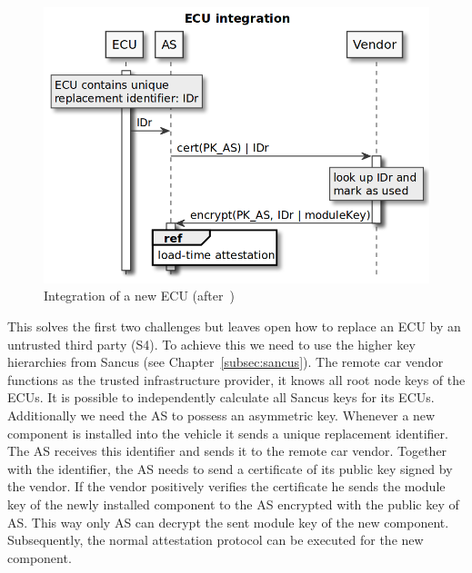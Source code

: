 \begin{figure}[h]
    \centering
    \captionsetup{justification=centering}
	\includegraphics[width=1\linewidth]{Figures/VulCAN_ecu_replacement.png}
	\caption[]{Integration of a new ECU (after~\cite{VanBulck2017})}
	\label{fig:vulcan_ecu_replacement}
\end{figure}

This solves the first two challenges but leaves open how to replace an ECU by an
untrusted third party (S4). To achieve this we need to use the higher key
hierarchies from Sancus (see Chapter~\ref{subsec:sancus}). The remote car vendor
functions as the trusted infrastructure provider, it knows all root node keys of
the ECUs. It is possible to independently calculate all Sancus keys for its
ECUs. Additionally we need the AS to possess an asymmetric key. Whenever a new
component is installed into the vehicle it sends a unique replacement
identifier. The AS receives this identifier and sends it to the remote car
vendor. Together with the identifier, the AS needs to send a certificate of its
public key signed by the vendor. If the vendor positively verifies the
certificate he sends the module key of the newly installed component to the AS
encrypted with the public key of AS\@. This way only AS can decrypt the sent
module key of the new component. Subsequently, the normal attestation protocol
can be executed for the new component.

